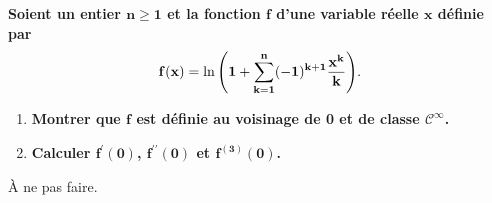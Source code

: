 \documentclass[a4paper, 11pt,reqno]{article}
\begin{document}
\begin{correction}
	\noindent \textbf{Soient un entier $\mathbf{n\geq 1}$ et la fonction $\mathbf{f}$ d'une variable r\'eelle $\mathbf{x}$ d\'efinie par}
	$$\mathbf{f(x)=\ln{\left( 1+\sum\limits_{k=1}^n (-1)^{k+1}  \displaystyle\frac{x^k}{k}  \right)}.}$$
	\begin{enumerate}
		\item  \textbf{Montrer que $\mathbf{f}$ est d\'efinie au voisinage de 0 et de classe $\mathbf{\mathcal{C}^{\infty}}$.}
		\item  \textbf{Calculer $\mathbf{f^{\prime}(0)}$, $\mathbf{f^{\prime\prime}(0)}$ et $\mathbf{f^{(3)}(0)}$.}
	\end{enumerate}
	\`{A} ne pas faire.
\end{correction}
\end{document}
